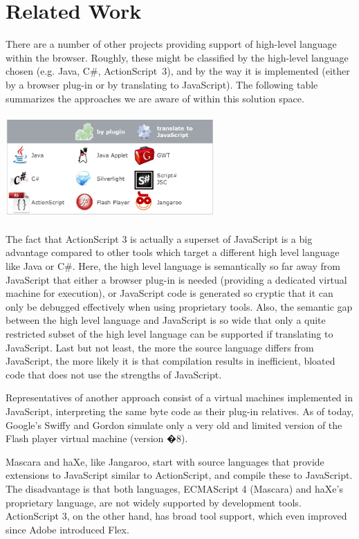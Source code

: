 \documentclass[10pt]{sigplanconf}
\begin{document}
\section{Related Work}

There are a number of other projects providing support of high-level language within the browser. Roughly, these might be classified by the high-level language chosen (e.g. Java, C\#, ActionScript\ 3), and by the way it is implemented (either by a browser plug-in or by translating to JavaScript). The following table summarizes the approaches we are aware of within this solution space.

\vspace{20pt}
\includegraphics[width=80mm,height=40mm]{TechnologyMatrix.png}
\vspace{20pt}

The fact that ActionScript 3 is actually a superset of JavaScript is a big advantage compared to other tools which target a different high level language like Java or C\#. Here, the high level language is semantically so far away from JavaScript that either a browser plug-in is needed (providing a dedicated virtual machine for execution), or JavaScript code is generated so cryptic that it can only be debugged effectively when using proprietary tools. Also, the semantic gap between the high level language and JavaScript is so wide that only a quite restricted subset of the high level language can be supported if translating to JavaScript. Last but not least, the more the source language differs from JavaScript, the more likely it is that compilation results in inefficient, bloated code that does not use the strengths of JavaScript.

Representatives of another approach consist of a virtual machines implemented in JavaScript, interpreting the same byte code as their plug-in relatives. As of today, Google's Swiffy\citep{swiffy} and Gordon\citep{gordon} simulate only a very old and limited version of the Flash player virtual machine (version �8). 

Mascara\citep{mascara} and haXe\citep{haxe}, like Jangaroo, start with source languages that provide extensions to JavaScript similar to ActionScript, and compile these to Java\-Script. The disadvantage is that both languages,  ECMAScript 4 (Mascara) and haXe's proprietary language, are not widely supported by development tools. ActionScript 3, on the other hand, has broad tool support, which even improved since Adobe introduced Flex\citep{flex}. 
\end{document}
